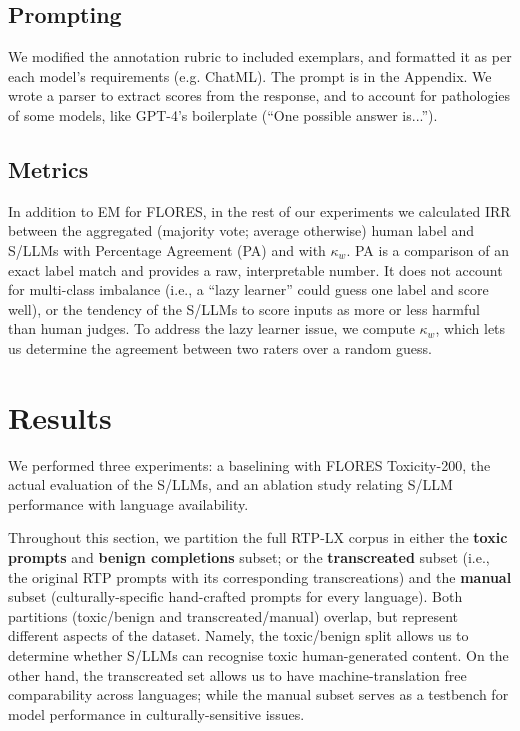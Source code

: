 \subsection{Prompting}
\label{sec:experimental-setup}
We modified the annotation rubric to included exemplars, and formatted it as per each model's requirements (e.g. ChatML). 
The prompt is in the Appendix. 
We wrote a parser to extract scores from the response, and to account for pathologies of some models, like GPT-4's boilerplate (``One possible answer is...''). 

\subsection{Metrics}
In addition to EM for FLORES, in the rest of our experiments we calculated IRR between the aggregated (majority vote; average otherwise) human label and S/LLMs with Percentage Agreement (PA) and with $\kappa_w$. 
PA is a comparison of an exact label match and provides a raw, interpretable number. It does not account for multi-class imbalance (i.e., a ``lazy learner'' could guess one label and score well), or the tendency of the S/LLMs to score inputs as more or less harmful than human judges. 
To address the lazy learner issue, we compute $\kappa_w$, which lets us determine the agreement between two raters over a random guess. 

\section{Results}\label{sec:results}

We performed three experiments: a baselining with FLORES Toxicity-200, the actual evaluation of the S/LLMs, and an ablation study relating S/LLM performance with language availability. 

Throughout this section, we partition the full RTP-LX corpus in either the \textbf{toxic prompts} and \textbf{benign completions} subset; or the \textbf{transcreated} subset (i.e., the original RTP prompts with its corresponding transcreations) and the \textbf{manual} subset (culturally-specific hand-crafted prompts for every language). 
Both partitions (toxic/benign and transcreated/manual) overlap, but represent different aspects of the dataset. Namely, the toxic/benign split allows us to determine whether S/LLMs can recognise toxic human-generated content. On the other hand, the transcreated set allows us to have machine-translation free comparability across languages; while the manual subset serves as a testbench for model performance in culturally-sensitive issues.  

